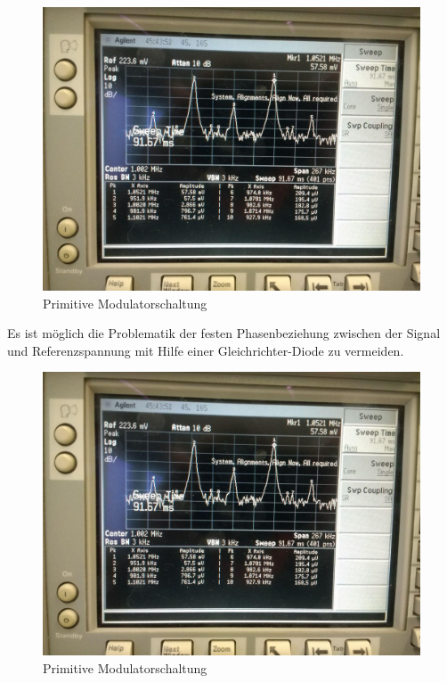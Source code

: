 \begin{figure}
	\centering
	\includegraphics[width=\textwidth]{img/Aufgabenteil_b.jpg}
	\caption{Primitive Modulatorschaltung}
	\label{abb:ringMod}
\end{figure}

Es ist möglich die Problematik der festen Phasenbeziehung zwischen der Signal und Referenzspannung mit Hilfe einer Gleichrichter-Diode 
zu vermeiden.

\begin{figure}
	\centering
	\includegraphics[width=\textwidth]{img/Aufgabenteil_b.jpg}
	\caption{Primitive Modulatorschaltung}
	\label{abb:ringMod}
\end{figure}


